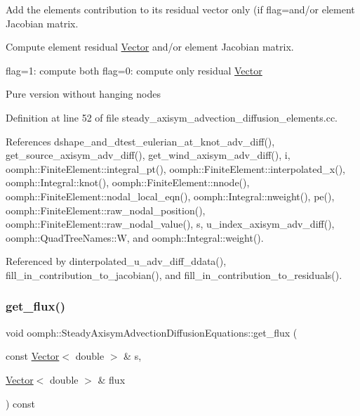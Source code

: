 Add the element\textquotesingle{}s contribution to its residual vector only (if flag=and/or element Jacobian matrix. 

Compute element residual \hyperlink{classoomph_1_1Vector}{Vector} and/or element Jacobian matrix.

flag=1\+: compute both flag=0\+: compute only residual \hyperlink{classoomph_1_1Vector}{Vector}

Pure version without hanging nodes 

Definition at line 52 of file steady\+\_\+axisym\+\_\+advection\+\_\+diffusion\+\_\+elements.\+cc.



References dshape\+\_\+and\+\_\+dtest\+\_\+eulerian\+\_\+at\+\_\+knot\+\_\+adv\+\_\+diff(), get\+\_\+source\+\_\+axisym\+\_\+adv\+\_\+diff(), get\+\_\+wind\+\_\+axisym\+\_\+adv\+\_\+diff(), i, oomph\+::\+Finite\+Element\+::integral\+\_\+pt(), oomph\+::\+Finite\+Element\+::interpolated\+\_\+x(), oomph\+::\+Integral\+::knot(), oomph\+::\+Finite\+Element\+::nnode(), oomph\+::\+Finite\+Element\+::nodal\+\_\+local\+\_\+eqn(), oomph\+::\+Integral\+::nweight(), pe(), oomph\+::\+Finite\+Element\+::raw\+\_\+nodal\+\_\+position(), oomph\+::\+Finite\+Element\+::raw\+\_\+nodal\+\_\+value(), s, u\+\_\+index\+\_\+axisym\+\_\+adv\+\_\+diff(), oomph\+::\+Quad\+Tree\+Names\+::W, and oomph\+::\+Integral\+::weight().



Referenced by dinterpolated\+\_\+u\+\_\+adv\+\_\+diff\+\_\+ddata(), fill\+\_\+in\+\_\+contribution\+\_\+to\+\_\+jacobian(), and fill\+\_\+in\+\_\+contribution\+\_\+to\+\_\+residuals().

\mbox{\label{classoomph_1_1SteadyAxisymAdvectionDiffusionEquations_a46303dd5c0af7fc086136779fcc9847c}} 
\subsubsection{\texorpdfstring{get\+\_\+flux()}{get\_flux()}}
{\footnotesize\ttfamily void oomph\+::\+Steady\+Axisym\+Advection\+Diffusion\+Equations\+::get\+\_\+flux (\begin{DoxyParamCaption}\item[{const \hyperlink{classoomph_1_1Vector}{Vector}$<$ double $>$ \&}]{s,  }\item[{\hyperlink{classoomph_1_1Vector}{Vector}$<$ double $>$ \&}]{flux }\end{DoxyParamCaption}) const\hspace{0.3cm}{\ttfamily [inline]}}



